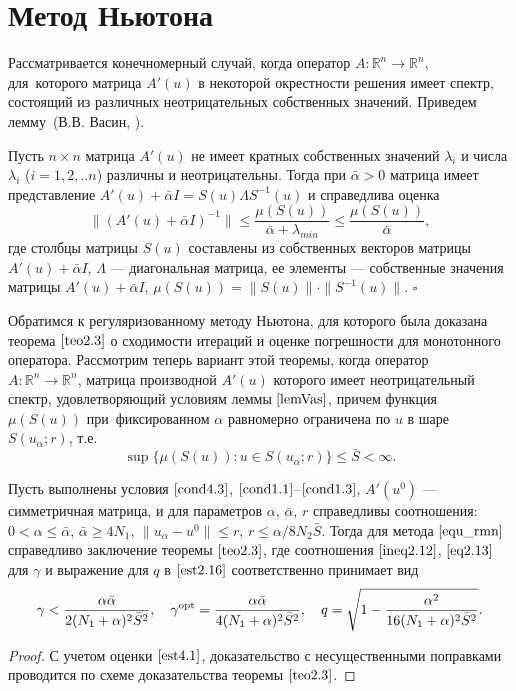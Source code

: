 \section{Метод Ньютона}
Рассматривается конечномерный случай, когда оператор $A\colon \mathbb{R}^n \to \mathbb{R}^n$, для~которого матрица $A'(u)$ в некоторой окрестности решения имеет спектр, состоящий из различных неотрицательных собственных значений.
Приведем лемму~(В.В. Васин, \cite{VasSkur2017}).
\begin{lemma}\label{lemVas}
	Пусть $n\times n$ матрица $A'(u)$ не имеет кратных собственных значений $\lambda _i$ и числа $\lambda _i$ ($i=1,2,..n$) различны и неотрицательны. Тогда при $\bar\alpha>0$ матрица имеет представление $A'(u)+\bar\alpha I =S(u)\Lambda S^{-1}(u)$ и справедлива оценка
	\begin{equation}\label{est4.1}
	\|(A'(u)+\bar\alpha I)^{-1}\|\le \frac{\mu (S(u))}{\bar\alpha+\lambda_{min}} \le \frac{\mu(S(u))}{\bar\alpha},
	\end{equation}
	где столбцы матрицы $S(u)$ составлены из собственных векторов матрицы $A'(u)+\bar\alpha I$, $\Lambda$ --- диагональная матрица, ее элементы --- собственные значения матрицы $A'(u)+\bar\alpha I$, $\mu(S(u))=\|S(u)\|\cdot\|S^{-1}(u)\|$. $\square$
\end{lemma}
Обратимся к регуляризованному методу Ньютона, для которого была доказана теорема $\ref{teo2.3}$ о сходимости итераций и оценке погрешности для монотонного оператора. Рассмотрим теперь вариант этой теоремы, когда оператор \\ $A\colon \mathbb{R}^n \to \mathbb{R}^n$, матрица производной $A'(u)$ которого имеет неотрицательный спектр, удовлетворяющий условиям леммы $\ref{lemVas}$, причем функция $\mu(S(u))$ при~фиксированном $\alpha$ равномерно ограничена по $u$ в шаре $S(u_\alpha; r)$, т.е.
\begin{equation}\label{cond4.3}
\sup\{\mu(S(u)): u\in S(u_\alpha; r)\}\le\bar S <\infty .
\end{equation}
\begin{theorem}\label{teo4.1}
	Пусть выполнены условия $\eqref{cond4.3}$, $\eqref{cond1.1}$--$\eqref{cond1.3}$, $A'(u^0)$ --- симметричная матрица, и для параметров $\alpha$, $\bar{\alpha}$, $r$ справедливы соотношения:\\ $0<\alpha\le\bar\alpha$, $\bar\alpha\ge 4N_1$,
	$\|u_\alpha-u^0\|\le r$, $r\le\alpha/8N_2\bar S$.
	Тогда для метода $\eqref{equ_rmn}$ справедливо заключение теоремы $\ref{teo2.3}$, где соотношения $\eqref{ineq2.12}$, $\eqref{eq2.13}$ для $\gamma$ и выражение для $q$ в $\eqref{est2.16}$ соответственно принимает вид
	$$\gamma < \frac{\alpha\bar\alpha}{2(N_1+\alpha)^2\bar S^2}, \quad \gamma ^{\textnormal{opt}}=\frac{\alpha\bar\alpha}{4(N_1+\alpha)^2\bar S^2}, \quad q=\sqrt{1-\frac{\alpha ^2}{16(N_1+\alpha)^2\bar S^2}}.$$
\end{theorem}
\begin{proof} С учетом оценки $\eqref{est4.1}$, доказательство с несущественными поправками проводится по схеме доказательства теоремы $\ref{teo2.3}$.
\end{proof}

